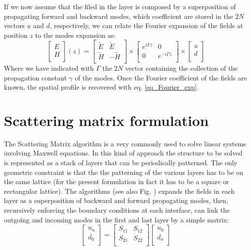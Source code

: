 \documentclass[a4paper,10pt]{report}
\begin{document}
If we now assume that the filed in the layer is composed by a superposition of propagating forward and backward modes, which coefficient are stored in the $2N$ vectors $u$ and $d$, respectively, we can relate the Fourier expansion of the fields at position $z$ to the modes expansion as:
\begin{equation}
\left[ \begin{array}{c} E \\ H \\ \end{array} \right] (z) = 
\left[ \begin{array}{cc} \tilde{E} & \tilde{E} \\ \tilde{H} & -\tilde{H} \\ \end{array} \right] \times
\left[ \begin{array}{cc} e^{i\Gamma z} & 0 \\ 0 & e^{-i\Gamma z} \\ \end{array} \right] \times
\left[ \begin{array}{c} u \\ d \\ \end{array} \right]
\end{equation}
Where we have indicated with $\Gamma$ the $2N$ vector containing the collection of the propagation constant $\gamma$ of the modes. Once the Fourier coefficient of the fields are known, the spatial profile is recovered with eq. \ref{eq_Fourier_exp}.

\section{Scattering matrix formulation}
The Scattering Matrix algorithm is a very commonly used to solve linear systems involving Maxwell equations. In this kind of approach the structure to be solved is represented as a stack of layers that can be periodically patterned. The only geometric constraint is that the the patterning of the various layers has to be on the same lattice (for the present formulation in fact it has to be a square or rectangular lattice). The algorithms (see also Fig. ) expands the fields in each layer as a superposition of backward and forward propagating modes, then, recursively enforcing the boundary conditions at each interface, can link the outgoing and incoming modes in the first and last layer by a simple matrix:
\begin{equation}
\left[ \begin{array}{c} u_n \\ d_0 \\ \end{array} \right] = 
\left[ \begin{array}{cc} S_{11} & S_{12} \\ S_{21} & S_{22} \\ \end{array} \right]
\left[ \begin{array}{c} u_0 \\ d_n \\ \end{array} \right]
\end{equation}
\end{document}
